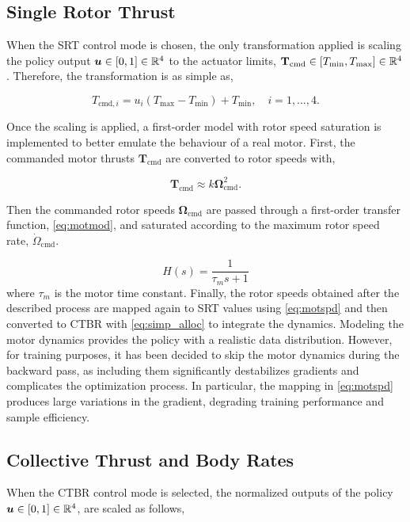 \subsection{Single Rotor Thrust} \label{sec:srt}
When the \ac{SRT} control mode is chosen, the only transformation applied is scaling the policy output $\boldsymbol{u} \in [0, 1]\in \mathbb{R}^4$ to the actuator limits, $\mathbf{T_{\text{cmd}}} \in [T_{\text{min}}, T_{\text{max}} ] \in \mathbb{R}^4$.
Therefore, the transformation is as simple as,

\begin{equation}
    T_{\text{cmd},i} = u_i \left( T_{\text{max}}- T_{\text{min}} \right) + T_{\text{min}}, \quad i = 1, \dots, 4.
\end{equation}


Once the scaling is applied, a first-order model with rotor speed saturation is implemented to better emulate the behaviour of a real motor.
First, the commanded motor thrusts $\mathbf{T}_{\text{cmd}}$ are converted to rotor speeds with,

\begin{equation} \label{eq:motspd}
    \mathbf{T}_{\text{cmd}} \approx k \boldsymbol{\Omega}_{\text{cmd}}^2.
\end{equation}

Then the commanded rotor speeds $\boldsymbol{\Omega}_{\text{cmd}}$ are passed through a first-order transfer function, \eqref{eq:motmod}, and saturated according to the maximum rotor speed rate, $\dot{\Omega}_{\text{cmd}}$.

\begin{equation}\label{eq:motmod}
    H(s) = \frac{1}{\tau_m s + 1}
\end{equation}
where $\tau_m$ is the motor time constant.
Finally, the rotor speeds obtained after the described process are mapped again to \ac{SRT} values using \eqref{eq:motspd} and then converted to \ac{CTBR} with \eqref{eq:simp_alloc} to integrate the dynamics.
Modeling the motor dynamics provides the policy with a realistic data distribution.
However, for training purposes, it has been decided to skip the motor dynamics during the backward pass, as including them significantly destabilizes gradients and complicates the optimization process.
In particular, the mapping in \eqref{eq:motspd} produces large variations in the gradient, degrading training performance and sample efficiency.

\subsection{Collective Thrust and Body Rates}\label{ctbr-bad}
When the \ac{CTBR} control mode is selected, the normalized outputs of the policy $\boldsymbol{u} \in [0, 1]\in \mathbb{R}^4$, are scaled as follows,

